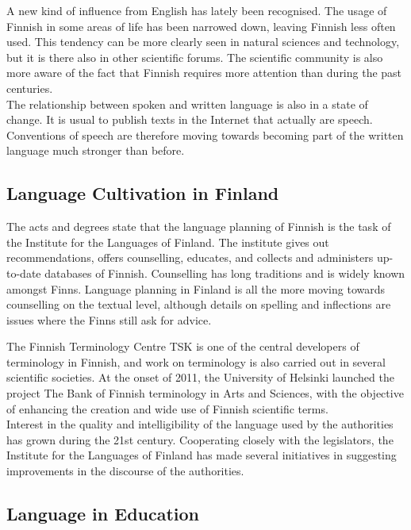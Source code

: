 \begin{multicols}{2}
A new kind of influence from English has lately been recognised. The usage of
Finnish in some areas of life has been narrowed down, leaving Finnish less
often used. This tendency can be more clearly seen in natural sciences and
technology, but it is there also in other scientific forums. The scientific
community is also more aware of the fact that Finnish requires more attention
than during the past centuries.\\
The relationship between spoken and written language is also in a state of
change. It is usual to publish texts in the Internet that actually are speech.
Conventions of speech are therefore moving towards becoming part of the written
language much stronger than before.

\subsection{Language Cultivation in Finland}

The acts and degrees state that the language planning of Finnish is the task of
the Institute for the Languages of Finland. The institute gives out
recommendations, offers counselling, educates, and collects and administers
up-to-date databases of Finnish. Counselling has long traditions and is widely
known amongst Finns. Language planning in Finland is all the more moving
towards counselling on the textual level, although details on spelling and
inflections are issues where the Finns still ask for advice.

The Finnish Terminology Centre TSK is one of the central developers of
terminology in Finnish, and work on terminology is also carried out in several
scientific societies. At the onset of 2011, the University of Helsinki launched
the project The Bank of Finnish terminology in Arts and Sciences, with the
objective of enhancing the creation and wide use of Finnish scientific terms.\\
Interest in the quality and intelligibility of the language used by the
authorities has grown during the 21st century. Cooperating closely with the
legislators, the Institute for the Languages of Finland has made several
initiatives in suggesting improvements in the discourse of the authorities.

\subsection{Language in Education}


\end{multicols}
